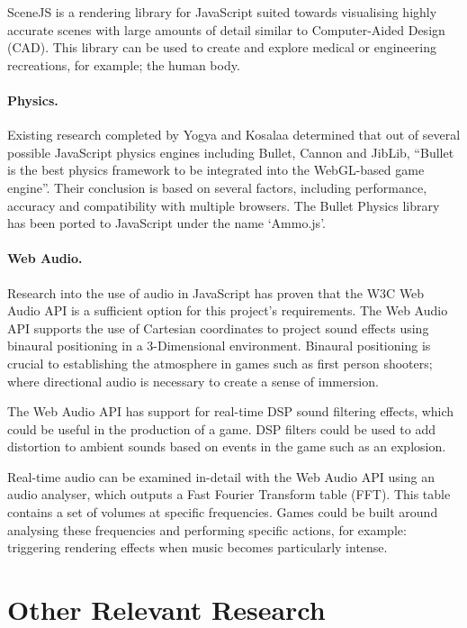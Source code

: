 SceneJS is a rendering library for JavaScript suited towards visualising highly accurate scenes with large amounts of detail similar to Computer-Aided Design (CAD). This library can be used to create and explore medical or engineering recreations, for example; the human body.\cite{scenejs}

\paragraph{Physics.}
Existing research completed by Yogya and Kosalaa determined that out of several possible JavaScript physics engines including Bullet, Cannon and JibLib, ``Bullet is the best physics framework to be integrated into the WebGL-based game engine''.\cite{yogya2014comparison} Their conclusion is based on several factors, including performance, accuracy and compatibility with multiple browsers. The Bullet Physics library has been ported to JavaScript under the name `Ammo.js'.


\paragraph{Web Audio.}
Research into the use of audio in JavaScript has proven that the W3C Web Audio API is a sufficient option for this project's requirements. The Web Audio API supports the use of Cartesian coordinates to project sound effects using binaural positioning in a 3-Dimensional environment.\cite{webaudio} Binaural positioning is crucial to establishing the atmosphere in games such as first person shooters; where directional audio is necessary to create a sense of immersion.

The Web Audio API has support for real-time DSP sound filtering effects, which could be useful in the production of a game. DSP filters could be used to add distortion to ambient sounds based on events in the game such as an explosion.

Real-time audio can be examined in-detail with the Web Audio API using an audio analyser, which outputs a Fast Fourier Transform table (FFT). This table contains a set of volumes at specific frequencies. Games could be built around analysing these frequencies and performing specific actions, for example: triggering rendering effects when music becomes particularly intense.

\section{Other Relevant Research}
